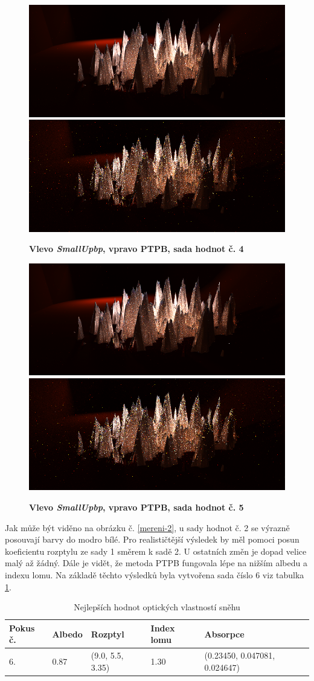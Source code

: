 \begin{figure}[H]\centering
\includegraphics[width=0.5\linewidth]{obrazky-figures/test-smallupbb-4-2h.png}\hfill
\includegraphics[width=0.5\linewidth]{obrazky-figures/test-ptpb-4-2h.png}\hfill
  \caption{\textbf{Vlevo \textit{SmallUpbp}, vpravo PTPB, sada hodnot č. 4}}
  \label{mereni-4}
\end{figure}
\begin{figure}[H]\centering
\includegraphics[width=0.5\linewidth]{obrazky-figures/test-smallupbb-5-2h.png}\hfill
\includegraphics[width=0.5\linewidth]{obrazky-figures/test-ptpb-5-2h.png}\hfill
  \caption{\textbf{Vlevo \textit{SmallUpbp}, vpravo PTPB, sada hodnot č. 5}}
  \label{mereni-5}
\end{figure}

Jak může být viděno na obrázku č. \ref{mereni-2}, u sady hodnot č. 2 se výrazně posouvají barvy do modro bílé. Pro realističtější výsledek by měl pomoci posun koeficientu rozptylu ze sady 1 směrem k sadě 2. U ostatních změn je dopad velice malý až žádný. Dále je vidět, že metoda PTPB fungovala lépe na nižším albedu a indexu lomu. Na základě těchto výsledků byla vytvořena sada číslo 6 viz tabulka \ref{mereni-tab-2}.

\begin{table}[h]\centering
\begin{tabular}{|l|l|l|l|l|}
\hline
 Pokus č. &Albedo&Rozptyl&Index lomu&Absorpce  \\ \hline
 6.& 0.87 & (9.0, 5.5, 3.35) & 1.30 & (0.23450, 0.047081, 0.024647) \\ \hline
\end{tabular}
\label{mereni-tab-2}
\caption{Nejlepších hodnot optických vlastností sněhu}
\end{table}

